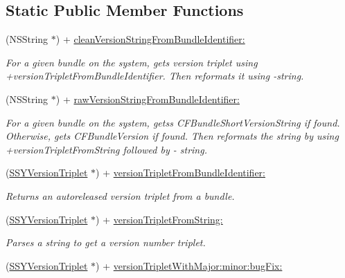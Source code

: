 \subsection*{Static Public Member Functions}
\begin{CompactItemize}
\item 
(NSString $\ast$) + \hyperlink{interface_s_s_y_version_triplet_5ec1d2dd6be65ebe2c05161d417e995e}{cleanVersionStringFromBundleIdentifier:}
\begin{CompactList}\small\item\em For a given bundle on the system, gets version triplet using +versionTripletFromBundleIdentifier. Then reformats it using -string. \item\end{CompactList}\item 
(NSString $\ast$) + \hyperlink{interface_s_s_y_version_triplet_6e29a80e862a92cb2844f2031c873539}{rawVersionStringFromBundleIdentifier:}
\begin{CompactList}\small\item\em For a given bundle on the system, getss CFBundleShortVersionString if found. Otherwise, gets CFBundleVersion if found. Then reformats the string by using +versionTripletFromString followed by - string. \item\end{CompactList}\item 
(\hyperlink{interface_s_s_y_version_triplet}{SSYVersionTriplet} $\ast$) + \hyperlink{interface_s_s_y_version_triplet_2bfb684acb045a630eaedf693da0d268}{versionTripletFromBundleIdentifier:}
\begin{CompactList}\small\item\em Returns an autoreleased version triplet from a bundle. \item\end{CompactList}\item 
(\hyperlink{interface_s_s_y_version_triplet}{SSYVersionTriplet} $\ast$) + \hyperlink{interface_s_s_y_version_triplet_4a2511b3efc1d98cbe6764b9719551e4}{versionTripletFromString:}
\begin{CompactList}\small\item\em Parses a string to get a version number triplet. \item\end{CompactList}\item 
\hypertarget{interface_s_s_y_version_triplet_78af5cd0dc002dcdd5e6242066a37c11}{
(\hyperlink{interface_s_s_y_version_triplet}{SSYVersionTriplet} $\ast$) + \hyperlink{interface_s_s_y_version_triplet_78af5cd0dc002dcdd5e6242066a37c11}{versionTripletWithMajor:minor:bugFix:}}
\label{interface_s_s_y_version_triplet_78af5cd0dc002dcdd5e6242066a37c11}


\end{CompactItemize}
